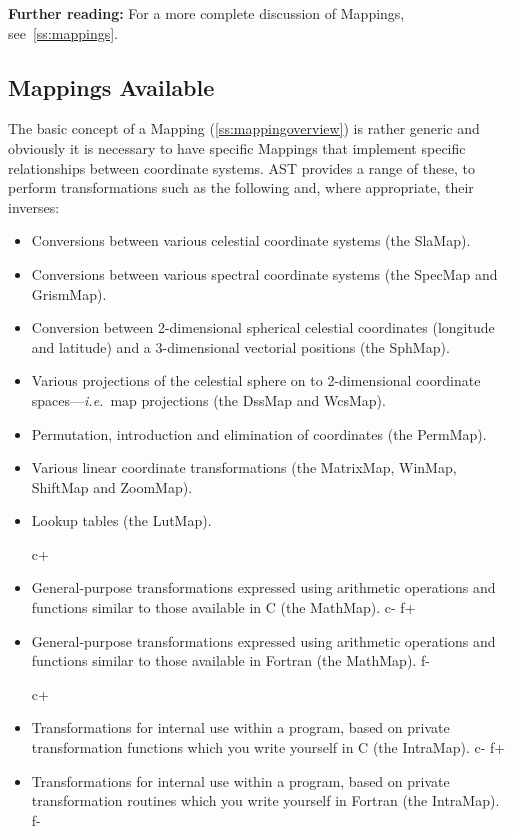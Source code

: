 \documentclass[twoside,11pt]{article}
\newcommand{\secref}[1]{\S\ref{#1}}
\renewcommand{\secref}[1]{\ref{#1}}
\begin{document}
{\bf{Further reading:}} For a more complete discussion of Mappings,
see~\secref{ss:mappings}.

\subsection{\label{ss:mappingselection}Mappings Available}

The basic concept of a Mapping (\secref{ss:mappingoverview}) is rather
generic and obviously it is necessary to have specific Mappings that
implement specific relationships between coordinate systems. AST
provides a range of these, to perform transformations such as the
following and, where appropriate, their inverses:

\begin{itemize}
\item Conversions between various celestial coordinate systems (the
SlaMap).

\item Conversions between various spectral coordinate systems (the
SpecMap and GrismMap).

\item Conversion between 2-dimensional spherical celestial coordinates
(longitude and latitude) and a 3-dimensional vectorial positions (the SphMap).

\item Various projections of the celestial sphere on to 2-dimensional
coordinate spaces---{\em{i.e.}}\ map projections (the DssMap and WcsMap).

\item Permutation, introduction and elimination of coordinates (the
PermMap).

\item Various linear coordinate transformations (the MatrixMap, WinMap,
ShiftMap and ZoomMap).

\item Lookup tables (the LutMap).

c+
\item General-purpose transformations expressed using arithmetic
operations and functions similar to those available in C (the
MathMap).
c-
f+
\item General-purpose transformations expressed using arithmetic
operations and functions similar to those available in Fortran (the
MathMap).
f-

c+
\item Transformations for internal use within a program, based on
private transformation functions which you write yourself in C (the
IntraMap).
c-
f+
\item Transformations for internal use within a program, based on
private transformation routines which you write yourself in Fortran
(the IntraMap).
f-
\end{itemize}
\end{document}
